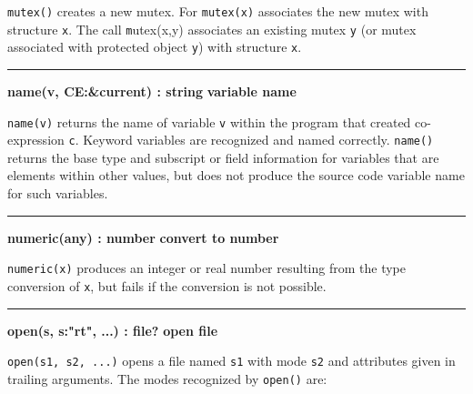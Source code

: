 \noindent
{}\texttt{mutex()} creates a new mutex. For \texttt{mutex(x)}
associates the new mutex with structure \texttt{x}.
The call {\texttt mutex(x,y)} associates an existing mutex \texttt{y} (or
mutex associated with protected object \texttt{y}) with
structure \texttt{x}.

\bigskip\hrule\vspace{0.1cm}
\noindent
{\bf name(v, CE:\&current) : string } \hfill {\bf variable name}

\noindent
{}\texttt{name(v)} returns the name of variable \texttt{v}
within the program that created co-expression \texttt{c}. Keyword
variables are recognized and named correctly. \texttt{name()} returns
the base type and subscript or field information for variables that are
elements within other values, but does not produce the source code
variable name for such variables. 

\bigskip\hrule\vspace{0.1cm}
\noindent
{\bf numeric(any) : number } \hfill {\bf convert to number}

\noindent
{}\texttt{numeric(x)} produces an integer or real
number resulting from the type conversion of \texttt{x}, but fails if
the conversion is not possible.

\bigskip\hrule\vspace{0.1cm}
\noindent
{\bf open(s, s:"rt", ...) : file? } \hfill {\bf open file}

\noindent
{}\texttt{open(s1, s2, ...)} opens a file named
\texttt{s1} with mode \texttt{s2} and attributes given in trailing
arguments. The modes recognized by \texttt{open()} are: 

